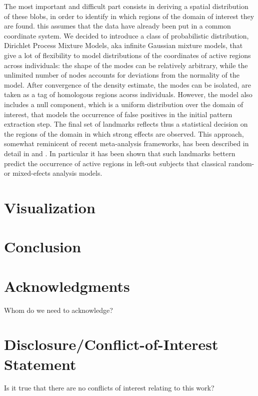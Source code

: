 \documentclass{bioinfo}
\begin{document}
The most important and difficult part consists in deriving a spatial
distribution of these blobs, in order to identify in which regions of
the domain of interest they are found.
%
this assumes that the data have already been put in a common coordinate
system.
%
We decided to introduce a class of probabilistic distribution,
Dirichlet Process Mixture Models, aka infinite Gaussian mixture
models, that give a lot of flexibility to model distributions of the
coordinates of active regions across individuals: the shape of the
modes can be relatively arbitrary, while the unlimited number of nodes
accounts for deviations from the normality of the model.
%
After convergence of the density estimate, the modes can be isolated,
are taken as a tag of homologous regions acorss individuals.
%
However, the model also includes a null component, which is a uniform
distribution over the domain of interest, that models the occurrence of
false positives in the initial pattern extraction step.
%
The final set of landmarks reflects thus a statistical decision on
the regions of the domain in which strong effects are observed.
%
This approach, somewhat reminicent of recent meta-analysis frameworks,
has been described in detail in \cite{Thirion2007} and
\cite{Thirion2010}.
%
In particular it has been shown that such landmarks bettern predict
the occurrence of active regions in left-out subjects that classical
random- or mixed-efects analysis models.




\section{Visualization}

\section{Conclusion}


\section*{Acknowledgments}
Whom do we need to acknowledge?

\section*{Disclosure/Conflict-of-Interest Statement}
Is it true that there are no conflicts of interest relating to this
work?
\end{document}
